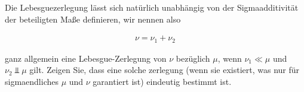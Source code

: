 
\begin{exercise}

Die Lebesguezerlegung lässt sich natürlich unabhängig von der Sigmaadditivität der beteiligten Maße definieren, wir nennen also

\begin{align*}
    \nu = \nu_1 + \nu_2
\end{align*}

ganz allgemein eine Lebesgue-Zerlegung von $\nu$ bezüglich $\mu$, wenn $\nu_1 \ll \mu$ und $\nu_2 \Bot \mu$ gilt.
Zeigen Sie, dass eine solche zerlegung (wenn sie existiert, was nur für sigmaendliches $\mu$ und $\nu$ garantiert ist) eindeutig bestimmt ist.

\end{exercise}


